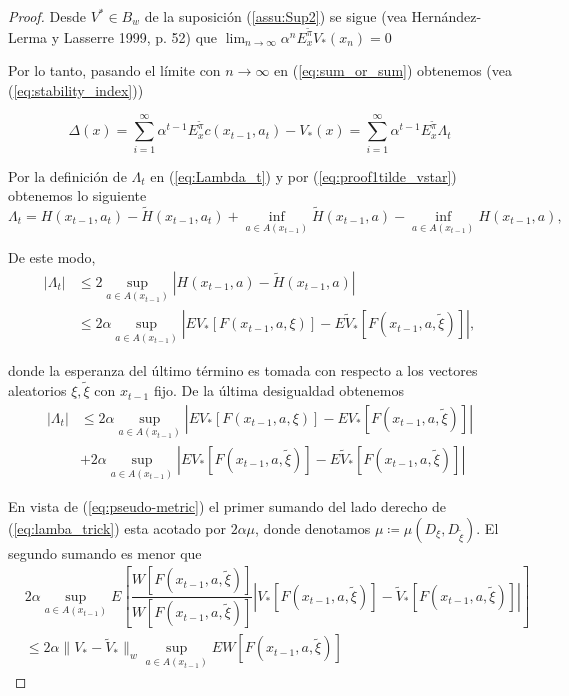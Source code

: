 \documentclass[11pt, spanish]{amsart}
\begin{document}
\begin{proof}
Desde $V^{*}\in B_{w}$ de la suposición (\ref{assu:Sup2}) se sigue
(vea Hernández-Lerma y Lasserre 1999, p. 52) que ${\displaystyle \lim_{n\to\infty}\alpha^{n}E_{x}^{\widetilde{\pi}}V_{*}\left(x_{n}\right)=0}$

Por lo tanto, pasando el límite con $n\to\infty$ en (\ref{eq:sum_or_sum})
obtenemos (vea (\ref{eq:stability_index}))

\begin{equation}
\Delta\left(x\right)=\sum_{i=1}^{\infty}\alpha^{t-1}E_{x}^{\widetilde{\pi}}c\left(x_{t-1},a_{t}\right)-V_{*}\left(x\right)=\sum_{i=1}^{\infty}\alpha^{t-1}E_{x}^{\widetilde{\pi}}\Lambda_{t}\label{eq:Delta_infinite}
\end{equation}

Por la definición de $\Lambda_{t}$ en (\ref{eq:Lambda_t}) y por
(\ref{eq:proof1tilde_vstar}) obtenemos lo siguiente 
\[
\Lambda_{t}=H\left(x_{t-1},a_{t}\right)-\widetilde{H}\left(x_{t-1},a_{t}\right)+\inf_{a\in A\left(x_{t-1}\right)}\widetilde{H}\left(x_{t-1},a\right)-\inf_{a\in A\left(x_{t-1}\right)}H\left(x_{t-1},a\right),
\]

De este modo, 
\begin{align}
\left|\Lambda_{t}\right| & \leq2\sup_{a\in A\left(x_{t-1}\right)}\left|H\left(x_{t-1},a\right)-\widetilde{H}\left(x_{t-1},a\right)\right|\nonumber \\
 & \leq2\alpha\sup_{a\in A\left(x_{t-1}\right)}\left|EV_{*}\left[F\left(x_{t-1},a,\xi\right)\right]-E\widetilde{V}_{*}\left[F\left(x_{t-1},a,\widetilde{\xi}\right)\right]\right|,\label{eq:Lambda_inequality}
\end{align}

donde la esperanza del último término es tomada con respecto a los
vectores aleatorios $\xi,\widetilde{\xi}$ con $x_{t-1}$ fijo. De
la última desigualdad obtenemos 
\begin{align}
\left|\Lambda_{t}\right| & \leq2\alpha\sup_{a\in A\left(x_{t-1}\right)}\left|EV_{*}\left[F\left(x_{t-1},a,\xi\right)\right]-EV_{*}\left[F\left(x_{t-1},a,\widetilde{\xi}\right)\right]\right|\label{eq:lamba_trick}\\
 & +2\alpha\sup_{a\in A\left(x_{t-1}\right)}\left|EV_{*}\left[F\left(x_{t-1},a,\widetilde{\xi}\right)\right]-E\widetilde{V}_{*}\left[F\left(x_{t-1},a,\widetilde{\xi}\right)\right]\right|\nonumber 
\end{align}

En vista de (\ref{eq:pseudo-metric}) el primer sumando del lado derecho
de (\ref{eq:lamba_trick}) esta acotado por $2\alpha\mu$, donde denotamos
$\mu\coloneqq\mu\left(D_{\xi},D_{\widetilde{\xi}}\right)$. El segundo
sumando es menor que 
\begin{align}
 & 2\alpha\sup_{a\in A\left(x_{t-1}\right)}E\left[\dfrac{W\left[F\left(x_{t-1},a,\widetilde{\xi}\right)\right]}{W\left[F\left(x_{t-1},a,\widetilde{\xi}\right)\right]}\left|V_{*}\left[F\left(x_{t-1},a,\widetilde{\xi}\right)\right]-\widetilde{V}_{*}\left[F\left(x_{t-1},a,\widetilde{\xi}\right)\right]\right|\right]\label{eq:trick_w}\\
 & \leq2\alpha\|V_{*}-\widetilde{V}_{*}\|_{w}\sup_{a\in A\left(x_{t-1}\right)}EW\left[F\left(x_{t-1},a,\widetilde{\xi}\right)\right]\nonumber 
\end{align}


\end{proof}
\end{document}
